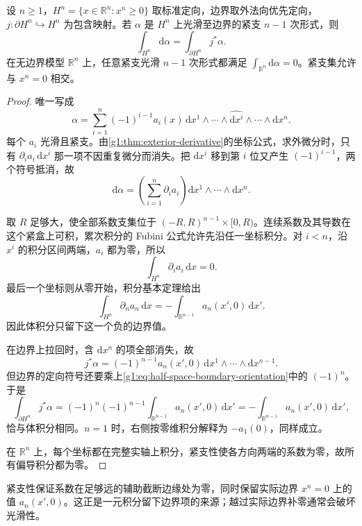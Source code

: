 \begin{lemma}\label{g1:lem:half-space-stokes}
	设 \(n\ge1\)，\(H^n=\{x\in\mathbb R^n:x^n\ge0\}\) 取标准定向，边界取外法向优先定向，\(j:\partial H^n\hookrightarrow H^n\) 为包含映射。若 \(\alpha\) 是 \(H^n\) 上光滑至边界的紧支 \(n-1\) 次形式，则
	\[
		\int_{H^n}\mathrm{d}\alpha=\int_{\partial H^n}j^*\alpha.
	\]
	在无边界模型 \(\mathbb R^n\) 上，任意紧支光滑 \(n-1\) 次形式都满足 \(\int_{\mathbb R^n}\mathrm{d}\alpha=0\)。紧支集允许与 \(x^n=0\) 相交。
\end{lemma}
\begin{proof}
	唯一写成
	\[
		\alpha=\sum_{i=1}^n(-1)^{i-1}a_i(x)\,
		\mathrm{d}x^1\wedge\cdots\wedge\widehat{\mathrm{d}x^i}\wedge\cdots\wedge\mathrm{d}x^n.
	\]
	每个 \(a_i\) 光滑且紧支。由\cref{g1:thm:exterior-derivative}的坐标公式，求外微分时，只有 \(\partial_i a_i\,\mathrm{d}x^i\) 那一项不因重复微分而消失。把 \(\mathrm{d}x^i\) 移到第 \(i\) 位又产生 \((-1)^{i-1}\)，两个符号抵消，故
	\begin{equation}\label{g1:eq:stokes-local-divergence}
		\mathrm{d}\alpha=\left(\sum_{i=1}^n\partial_i a_i\right)
		\mathrm{d}x^1\wedge\cdots\wedge\mathrm{d}x^n.
	\end{equation}

	取 \(R\) 足够大，使全部系数支集位于 \((-R,R)^{n-1}\times[0,R)\)。连续系数及其导数在这个紧盒上可积，累次积分的 Fubini 公式允许先沿任一坐标积分。对 \(i<n\)，沿 \(x^i\) 的积分区间两端，\(a_i\) 都为零，所以
	\[
		\int_{H^n}\partial_i a_i\,\mathrm{d}x=0.
	\]
	最后一个坐标则从零开始，积分基本定理给出
	\[
		\int_{H^n}\partial_n a_n\,\mathrm{d}x
		=-\int_{\mathbb R^{n-1}}a_n(x',0)\,\mathrm{d}x'.
	\]
	因此体积分只留下这一个负的边界值。

	在边界上拉回时，含 \(\mathrm{d}x^n\) 的项全部消失，故
	\[
		j^*\alpha=(-1)^{n-1}a_n(x',0)\,
		\mathrm{d}x^1\wedge\cdots\wedge\mathrm{d}x^{n-1}.
	\]
	但边界的定向符号还要乘上\eqref{g1:eq:half-space-boundary-orientation}中的 \((-1)^n\)。于是
	\[
		\int_{\partial H^n}j^*\alpha
		=(-1)^n(-1)^{n-1}\int_{\mathbb R^{n-1}}a_n(x',0)\,\mathrm{d}x'
		=-\int_{\mathbb R^{n-1}}a_n(x',0)\,\mathrm{d}x',
	\]
	恰与体积分相同。\(n=1\) 时，右侧按零维积分解释为 \(-a_1(0)\)，同样成立。

	在 \(\mathbb R^n\) 上，每个坐标都在完整实轴上积分，紧支性使各方向两端的系数为零，故所有偏导积分都为零。
\end{proof}

紧支性保证系数在足够远的辅助截断边缘处为零，同时保留实际边界 \(x^n=0\) 上的值 \(a_n(x',0)\)。这正是一元积分留下边界项的来源；越过实际边界补零通常会破坏光滑性。

